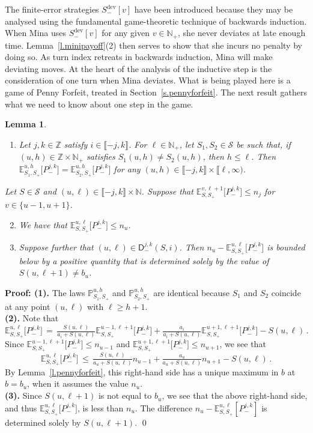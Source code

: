 \documentclass[letterpaper,11pt,oneside,reqno]{amsbook}
\newcommand{\PP}{\ensuremath{\mathbb{P}}}
\newcommand{\N}{\ensuremath{\mathbb{N}}}
\newcommand{\Z}{\ensuremath{\mathbb{Z}}}
\newcommand{\E}[0]{\mathbb{E}}
\numberwithin{figure}{chapter}
\newtheorem{lemma}[theorem]{Lemma}
\theoremstyle{definition}
\theoremstyle{definition}
\theoremstyle{definition}
\theoremstyle{definition}
\theoremstyle{definition}
\newcommand{\mc}{\mathcal}
\newcommand{\nwithzero}{\N}
\newcommand{\nwithoutzero}{\N_+}
\newcommand\egameplay[3]{\E^{#3}_{#1,#2}}
\newcommand{\sdev}{S_-^{\textrm{dev}}}
\begin{document}
 The finite-error strategies $\sdev[v]$ have been introduced because they may be analysed using the fundamental game-theoretic technique of backwards induction. When Mina uses $\sdev[v]$ for any given $v \in \nwithoutzero$, she never deviates at late enough time. Lemma~\ref{l.minipayoff}(2) then serves to show that she incurs no penalty by doing so. As turn index retreats in backwards induction, Mina will make deviating moves. At the heart of the analysis of the inductive step is the consideration of one turn when Mina deviates. What is being played here is a game of Penny Forfeit, treated in Section~\ref{s.pennyforfeit}. The next result gathers what we need to know about one step in the game.
\begin{lemma}\label{l.onestep}
\leavevmode
\begin{enumerate}
\item
Let $j,k \in \Z$ satisfy $i \in \llbracket -j,k \rrbracket$.
For $\ell \in \nwithoutzero$, let $S_1,S_2 \in \mc{S}$ be such that, if $(u,h) \in \Z \times \nwithoutzero$ satisfies
$S_1(u,h) \not= S_2(u,h)$, then $h \leq \ell$.
Then $\E^{u,h}_{S_1,S_+} \big[ P^{j,k}_- \big] = \E^{u,h}_{S_2,S_+} \big[ P^{j,k}_- \big]$ for any $(u,h) \in \llbracket -j,k \rrbracket \times \llbracket \ell, \infty)$.
\end{enumerate}
Let $S \in \mc{S}$ and $(u,\ell) \in \llbracket -j,k \rrbracket \times \nwithzero$. Suppose that $\E^{v,\ell+1}_{S,S_+} \big[ P^{j,k}_- \big] \leq n_j$ for $v \in \{u-1,u+1\}$.
\begin{enumerate}
 \setcounter{enumi}{1}
\item We have that
$\E^{u,\ell}_{S,S_+} \big[ P^{j,k}_- \big] \leq n_u$. 
\item Suppose further that 
 $(u,\ell) \in \mathsf{D}^{j,k}_-(S,i)$. Then $n_u - \E^{u,\ell}_{S,S_+} \big[ P^{j,k}_- \big]$ is bounded below by a positive quantity that is determined solely by the value of $S(u,\ell+1) \not= b_u$.
\end{enumerate}
\end{lemma}
{\bf Proof: (1).} The laws $\PP^{u,h}_{S_1,S_+}$ and $\PP^{u,h}_{S_2,S_+}$
are identical because $S_1$ and $S_2$ coincide at any point $(u,\ell)$ with $\ell \geq h+1$. \\
{\bf (2).}  Note that
$$
\E^{u,\ell}_{S,S_+} \big[ P^{j,k}_- \big] \, = \, \tfrac{S(u,\ell)}{a_i+S(u,\ell)}  \E^{u-1,\ell+1}_{S,S_+} \big[ P^{j,k}_- \big] 
+ \tfrac{a_i}{a_i+S(u,\ell)} \E^{u+1,\ell+1}_{S,S_+} \big[ P^{j,k}_- \big] - S(u,\ell) \, .
$$
Since $\E^{u-1,\ell+1}_{S,S_+} \big[ P^{j,k}_- \big] \leq n_{u-1}$ and $\E^{u+1,\ell+1}_{S,S_+} \big[ P^{j,k}_- \big] \leq n_{u+1}$, we see that
 $$
\E^{u,\ell}_{S,S_+} \big[ P^{j,k}_- \big] \, \leq \, \tfrac{S(u,\ell)}{a_u+S(u,\ell)}  n_{u-1}
+ \tfrac{a_u}{a_u+S(u,\ell)}  n_{u+1} - S(u,\ell) \, .
$$
 By Lemma~\ref{l.pennyforfeit}, this right-hand side has a unique maximum in $b$ at $b = b_u$, when it assumes the value $n_u$.\\
 {\bf (3).} Since $S(u,\ell+1)$ is not equal to $b_u$, we see that the above right-hand side, and thus $\E^{u,\ell}_{S,S_+} \big[ P^{j,k}_- \big]$, is less than $n_u$. The difference $n_u - \egameplay{S}{S_+}{u,\ell}[P^{j,k}_-]$ is determined solely by $S(u,\ell+1)$. \qed
\end{document}
